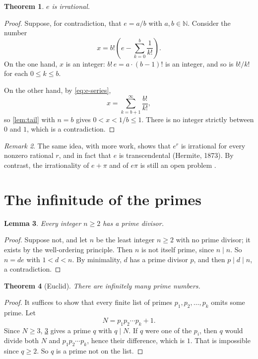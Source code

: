 \documentclass[11pt]{article}
\theoremstyle{plain}
\newtheorem{theorem}{Theorem}[section]
\newtheorem{lemma}[theorem]{Lemma}
\theoremstyle{definition}
\theoremstyle{remark}
\newtheorem{remark}[theorem]{Remark}
\newcommand{\N}{\mathbb{N}}
\begin{document}
\begin{theorem}
\label{thm:e}
$e$ is irrational.
\end{theorem}

\begin{proof}
Suppose, for contradiction, that $e = a/b$ with $a, b \in \N$. Consider the number
\[
  x = b!\left( e - \sum_{k=0}^{b} \frac{1}{k!} \right).
\]
On the one hand, $x$ is an integer: $b!\,e = a \cdot (b-1)!$ is an integer, and so is $b!/k!$ for each $0 \le k \le b$.

On the other hand, by \eqref{eq:e-series},
\[
  x = \sum_{k=b+1}^{\infty} \frac{b!}{k!},
\]
so \cref{lem:tail} with $n = b$ gives $0 < x < 1/b \le 1$. There is no integer strictly between $0$ and $1$, which is a contradiction.
\end{proof}

\begin{remark}
The same idea, with more work, shows that $e^r$ is irrational for every nonzero rational $r$, and in fact that $e$ is transcendental (Hermite, 1873). By contrast, the irrationality of $e + \pi$ and of $e\pi$ is still an open problem \cite{niven1956}.
\end{remark}

\section{The infinitude of the primes}
\label{sec:primes}

\begin{lemma}
\label{lem:prime-divisor}
Every integer $n \ge 2$ has a prime divisor.
\end{lemma}

\begin{proof}
Suppose not, and let $n$ be the least integer $n \ge 2$ with no prime divisor; it exists by the well-ordering principle. Then $n$ is not itself prime, since $n \mid n$. So $n = de$ with $1 < d < n$. By minimality, $d$ has a prime divisor $p$, and then $p \mid d \mid n$, a contradiction.
\end{proof}

\begin{theorem}[Euclid]
\label{thm:euclid}
There are infinitely many prime numbers.
\end{theorem}

\begin{proof}
It suffices to show that every finite list of primes $p_1, p_2, \dots, p_k$ omits some prime. Let
\[
  N = p_1 p_2 \cdots p_k + 1.
\]
Since $N \ge 3$, \cref{lem:prime-divisor} gives a prime $q$ with $q \mid N$. If $q$ were one of the $p_i$, then $q$ would divide both $N$ and $p_1 p_2 \cdots p_k$, hence their difference, which is $1$. That is impossible since $q \ge 2$. So $q$ is a prime not on the list.
\end{proof}
\end{document}
